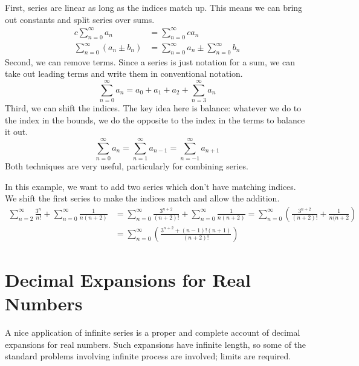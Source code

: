 \documentclass[fleqn]{report}
\begin{document}
First, series are linear as long as the indices
match up. This means we can bring out constants and split
series over sums.
\begin{align*}
c \sum_{n=0}^\infty a_n & = \sum_{n=0}^\infty ca_n \\
\sum_{n=0}^\infty (a_n \pm b_n) & = \sum_{n=0}^\infty a_n \pm
\sum_{n=0}^\infty b_n 
\end{align*}
Second, we can remove terms. Since a series is just
notation for a sum, we can take out leading terms and write
them in conventional notation.
\begin{equation*}
\sum_{n=0}^\infty a_n = a_0 + a_1 + a_2 + \sum_{n=3}^\infty a_n
\end{equation*}
Third, we can shift the indices. The key
idea here is balance: whatever we do to the index in the
bounds, we do the opposite to the index in the terms to
balance it out.
\begin{equation*}
\sum_{n=0}^\infty a_n = \sum_{n=1}^\infty a_{n-1} =
\sum_{n=-1}^\infty a_{n+1} 
\end{equation*}
Both techniques are very useful, particularly for combining
series. 

\begin{example}
In this example, we want to add two series which don't
have matching indices. We shift the first series to make the
indices match and allow the addition.
\begin{align*}
\sum_{n=2}^\infty \frac{3^n}{n!} + \sum_{n=0}^\infty
\frac{1}{n(n+2)} & = 
\sum_{n=0}^\infty \frac{3^{n+2}}{(n+2)!} + \sum_{n=0}^\infty
\frac{1}{n(n+2)}
= \sum_{n=0}^\infty \left( \frac{3^{n+2}}{(n+2)!} +
\frac{1}{n(n+2} \right) \\
& = \sum_{n=0}^\infty \left( \frac{3^{n+2} +
(n-1)!(n+1)}{(n+2)!} \right)
\end{align*}
\end{example}

\section{Decimal Expansions for Real Numbers}
\label{decimal-expansions}

A nice application of infinite series is a proper and complete
account of decimal expansions for real numbers. Such
expansions have infinite length, so some of the standard
problems involving infinite process are involved; limits are
required. 
\end{document}
